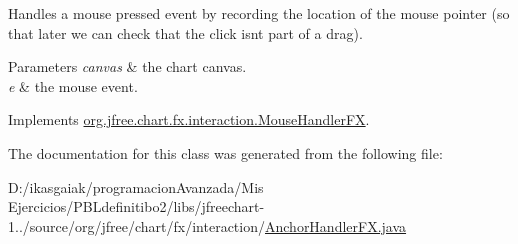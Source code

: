 Handles a mouse pressed event by recording the location of the mouse pointer (so that later we can check that the click isn\textquotesingle{}t part of a drag).


\begin{DoxyParams}{Parameters}
{\em canvas} & the chart canvas. \\
\hline
{\em e} & the mouse event. \\
\hline
\end{DoxyParams}


Implements \mbox{\hyperlink{interfaceorg_1_1jfree_1_1chart_1_1fx_1_1interaction_1_1_mouse_handler_f_x_a0cf92e5a448b58c199fc12dbdbd39aab}{org.\+jfree.\+chart.\+fx.\+interaction.\+Mouse\+Handler\+FX}}.



The documentation for this class was generated from the following file\+:\begin{DoxyCompactItemize}
\item 
D\+:/ikasgaiak/programacion\+Avanzada/\+Mis Ejercicios/\+P\+B\+Ldefinitibo2/libs/jfreechart-\/1../source/org/jfree/chart/fx/interaction/\mbox{\hyperlink{_anchor_handler_f_x_8java}{Anchor\+Handler\+F\+X.\+java}}\end{DoxyCompactItemize}
